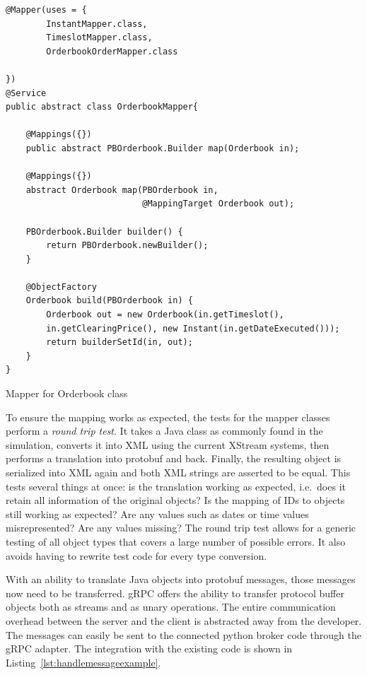 \begin{listing}[ht]
    \begin{verbatim}
@Mapper(uses = {
        InstantMapper.class,
        TimeslotMapper.class,
        OrderbookOrderMapper.class

})
@Service
public abstract class OrderbookMapper{

    @Mappings({})
    public abstract PBOrderbook.Builder map(Orderbook in);

    @Mappings({})
    abstract Orderbook map(PBOrderbook in,
                           @MappingTarget Orderbook out);

    PBOrderbook.Builder builder() {
        return PBOrderbook.newBuilder();
    }

    @ObjectFactory
    Orderbook build(PBOrderbook in) {
        Orderbook out = new Orderbook(in.getTimeslot(),
        in.getClearingPrice(), new Instant(in.getDateExecuted()));
        return builderSetId(in, out);
    }
}
    \end{verbatim}
    \caption{Mapper for Orderbook class}
    \label{lst:mapperexample}
\end{listing}

To ensure the mapping works as expected, the tests for the mapper classes perform a \emph{round trip test}. It takes a
Java class as commonly found in the simulation, converts it into \ac{XML} using the current XStream systems, then
performs a translation into protobuf  and back. Finally, the resulting object is serialized into \ac{XML} again and
both \ac{XML} strings are asserted to be equal. This tests several things at once: is the translation
working as expected, i.e.\ does it retain all information of the original objects? Is the mapping of IDs to objects
still working as expected? Are any values such as dates or time values misrepresented? Are any values missing? The round
trip test allows for a generic testing of all object types that covers a large number of possible errors. It also avoids
having to rewrite test code for every type conversion.

With an ability to translate Java objects into protobuf messages, those messages now need to be transferred. \ac{gRPC}
offers the ability to transfer protocol buffer objects both as streams and as unary operations. The entire communication
overhead between the server and the client is abstracted away from the developer. The messages can easily be
sent to the connected python broker code through the \ac{gRPC} adapter. The integration with the existing code is shown
in Listing~\ref{lst:handlemessageexample}.

